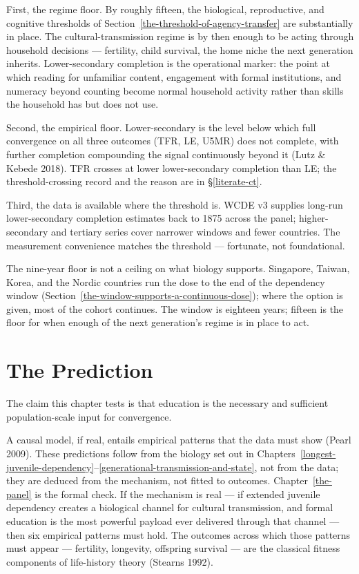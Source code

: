 \documentclass[12pt,letterpaper]{article}
\begin{document}
First, the regime floor. By roughly fifteen, the biological,
reproductive, and cognitive thresholds of
Section~\ref{the-threshold-of-agency-transfer} are substantially in
place. The cultural-transmission regime is by then enough to be
acting through household decisions --- fertility, child survival,
the home niche the next generation inherits. Lower-secondary
completion is the operational marker: the point at which reading for
unfamiliar content, engagement with formal institutions, and
numeracy beyond counting become normal household activity rather
than skills the household has but does not use.

Second, the empirical floor. Lower-secondary is the level below which
full convergence on all three outcomes (TFR, LE, U5MR) does not
complete, with further completion compounding the signal continuously
beyond it (Lutz \& Kebede 2018). TFR crosses at lower lower-secondary
completion than LE; the threshold-crossing record and the reason are
in \S\ref{literate-ct}.

Third, the data is available where the threshold is. WCDE v3
supplies long-run lower-secondary completion estimates back to 1875
across the panel; higher-secondary and tertiary series cover
narrower windows and fewer countries. The measurement convenience
matches the threshold --- fortunate, not foundational.

The nine-year floor is not a ceiling on what biology supports.
Singapore, Taiwan, Korea, and the Nordic countries run the dose to
the end of the dependency window
(Section~\ref{the-window-supports-a-continuous-dose}); where the
option is given, most of the cohort continues. The window is
eighteen years; fifteen is the floor for when enough of the next
generation's regime is in place to act.

\section{The Prediction}\label{the-prediction}

The claim this chapter tests is that education is the necessary and
sufficient population-scale input for convergence.

A causal model, if real, entails empirical patterns that the data
must show (Pearl 2009). These predictions follow from the biology
set out in Chapters~\ref{longest-juvenile-dependency}--\ref{generational-transmission-and-state},
not from the data; they are deduced from the mechanism, not fitted
to outcomes. Chapter~\ref{the-panel} is the formal check. If the
mechanism is real --- if extended juvenile dependency creates a
biological channel for cultural transmission, and formal education
is the most powerful payload ever delivered through that channel ---
then six empirical patterns must hold. The outcomes across which
those patterns must appear --- fertility, longevity, offspring
survival --- are the classical fitness components of life-history
theory (Stearns 1992).
\end{document}
